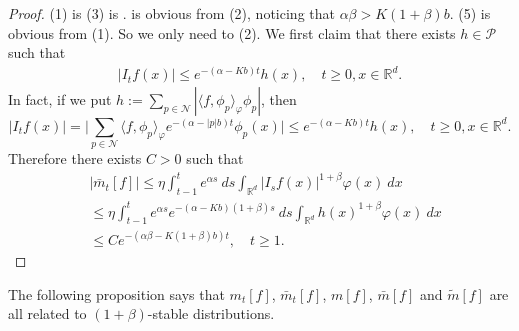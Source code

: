 \documentclass[12pt,a4paper]{amsart}
\theoremstyle{plain}
\theoremstyle{definition}
\numberwithin{equation}{section}
\begin{document}
\begin{proof}
  (1) is  \cite[Lemma 2.7]{MarksMilos2018CLT} (3) is \cite[Lemma 4.2]{MarksMilos2018CLT}.
  is obvious from (2), noticing that $\alpha\beta>K(1+\beta)b$. (5) is obvious from (1).
  So we only need to  (2). We first claim that there exists $h\in \mathcal{P}$ such that
  \begin{align}
    \label{ineq: control of Itg}
    |I_tf(x)|
    \leq e^{-(\alpha-Kb)t}h(x),
    \quad t\geq 0, x\in \mathbb{R}^d.
  \end{align}
  In fact, if we put $h:= \sum_{p\in \mathcal N} |\langle f,\phi_p\rangle_{\varphi}\phi_p|$, then
\begin{equation}
  \label{eq: supper for Itf}
  |I_tf(x)|
  =\Big|\sum_{p\in\mathcal{N}} \langle f,\phi_p\rangle_{\varphi} e^{-(\alpha-|p|b)t}\phi_p(x)\Big|
  \leq e^{-(\alpha-Kb)t}h(x),
  \quad t\geq 0,x\in \mathbb{R}^d.
\end{equation}
Therefore there exists  $C>0$ such that
\begin{align}
  & |\bar{m}_t[f]|
    \leq \eta \int_{t-1}^{t} e^{\alpha s}~ds \int_{\mathbb R^d} | I_sf(x)|^{1+\beta}\varphi(x)~dx \\
  & \leq \eta \int_{t-1}^{t} e^{\alpha s}e^{-(\alpha-Kb)(1+\beta)s}~ds\int_{\mathbb R^d} h(x)^{1+\beta}\varphi(x)~dx \\
  & \leq C e^{-(\alpha\beta-K(1+\beta)b)t}
    , \quad t\geq 1.
\end{align}
%
% 
% 
\end{proof}
The following proposition says that $m_t[f]$, $\bar m_t[f]$, $m[f]$, $\bar m[f]$ and  $\widetilde m[f]$ are all related to $(1+\beta)$-stable distributions.
\end{document}
